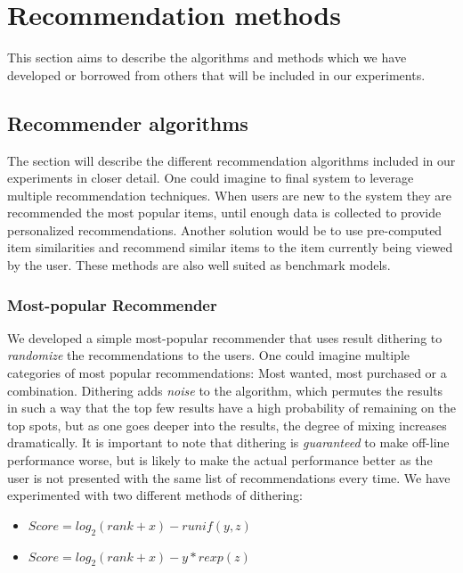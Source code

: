 
\section{Recommendation methods}

This section aims to describe the algorithms and methods which we have developed or borrowed from others that will be included in our experiments.

\subsection{Recommender algorithms}

The section will describe the different recommendation algorithms included in our experiments in closer detail.
One could imagine to final system to leverage multiple recommendation techniques. When users are new to the system they
are recommended the most popular items, until enough data is collected to provide personalized recommendations. Another solution would be to use pre-computed item similarities and recommend similar items to the item currently being viewed by the user. These methods are also well suited as benchmark models.

\subsubsection{Most-popular Recommender}

We developed a simple most-popular recommender that uses result dithering to \emph{randomize} the recommendations to the users. One could imagine multiple categories of most popular recommendations: Most wanted, most purchased or a combination. Dithering adds \emph{noise} to the algorithm, which permutes the results in such a way that the top few results have a high probability of remaining on the top spots, but as one goes deeper into the results, the degree of mixing increases dramatically. It is important to note that dithering is \emph{guaranteed} to make off-line performance worse, but is likely to make the actual performance better as the user is not presented with the same list of recommendations every time. We have experimented with two different methods of dithering:

\begin{itemize}
\item $Score = log_2(rank+x) - runif(y, z)$
\item $Score = log_2(rank+x) - y*rexp(z)$
\end{itemize}


